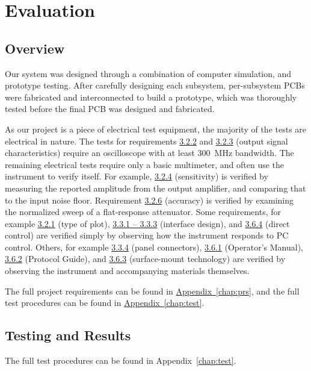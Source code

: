 \chapter{Evaluation}

\section{Overview}
Our system was designed through a combination of computer simulation, and
prototype testing. After carefully designing each subsystem,
per-subsystem PCBs were fabricated and interconnected to build a prototype, which was
thoroughly tested before the final PCB was designed and fabricated.

As our project is a piece of electrical test equipment, the majority of the
tests are electrical in nature. The tests for requirements \hyperref[prs:3.2.2]{3.2.2}
and \hyperref[prs:3.2.3]{3.2.3} (output signal characteristics) require
an oscilloscope with at least $300$~MHz bandwidth. The remaining electrical
tests require only a basic multimeter, and often use the instrument to
verify itself. For example, \hyperref[prs:3.2.4]{3.2.4} (sensitivity) is
verified by measuring the reported amplitude from the output amplifier, and
comparing that to the input noise floor. Requirement \hyperref[prs:3.2.6]{3.2.6}
(accuracy) is verified by examining the normalized sweep of a flat-response
attenuator. Some requirements, for example \hyperref[prs:3.2.1]{3.2.1} (type
of plot), \hyperref[prs:3.3.1]{3.3.1 -- 3.3.3} (interface design), and \hyperref[prs:3.6.4]{3.6.4}
(direct control) are verified simply by observing how the instrument responds to
PC control. Others, for example \hyperref[prs:3.3.4]{3.3.4} (panel connectors),
\hyperref[prs:3.6.1]{3.6.1} (Operator's Manual), \hyperref[prs:3.6.2]{3.6.2} (Protocol Guide),
and \hyperref[prs:3.6.3]{3.6.3} (surface-mount technology) are verified by observing the
instrument and accompanying materials themselves.

The full project requirements can be found in \hyperref[chap:prs]{Appendix~\ref{chap:prs}}, and the full
test procedures can be found in \hyperref[chap:test]{Appendix~\ref{chap:test}}.

\section{Testing and Results}

The full test procedures can be found in Appendix~\ref{chap:test}.


